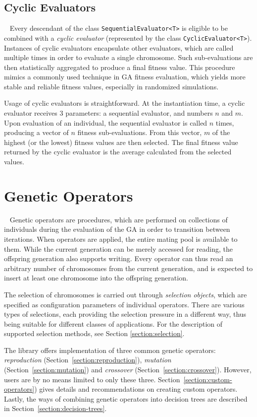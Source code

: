 \subsection{Cyclic Evaluators}~\label{section:cyclic-evaluators}
Every descendant of the class \texttt{SequentialEvaluator<T>} is eligible to be combined with a \textit{cyclic evaluator} (represented by the class \texttt{CyclicEvaluator<T>}). Instances of cyclic evaluators encapsulate other evaluators, which are called multiple times in order to evaluate a single chromosome. Such sub-evaluations are then statistically aggregated to produce a final fitness value. This procedure mimics a commonly used technique in GA fitness evaluation, which yields more stable and reliable fitness values, especially in randomized simulations.

Usage of cyclic evaluators is straightforward. At the instantiation time, a cyclic evaluator receives 3 parameters: a sequential evaluator, and numbers $n$ and $m$. Upon evaluation of an individual, the sequential evaluator is called $n$ times, producing a vector of $n$ fitness sub-evaluations. From this vector, $m$ of the highest (or the lowest) fitness values are then selected. The final fitness value returned by the cyclic evaluator is the average calculated from the selected values.

\section{Genetic Operators}~\label{section:genetic-operators}
Genetic operators are procedures, which are performed on collections of individuals during the evaluation of the GA in order to transition between iterations. When operators are applied, the entire mating pool is available to them. While the current generation can be merely accessed for reading, the offspring generation also supports writing. Every operator can thus read an arbitrary number of chromosomes from the current generation, and is expected to insert at least one chromosome into the offspring generation.

The selection of chromosomes is carried out through \textit{selection objects}, which are specified as configuration parameters of individual operators. There are various types of selections, each providing the selection pressure in a different way, thus being suitable for different classes of applications. For the description of supported selection methods, see Section \ref{section:selection}.

The library offers implementation of three common genetic operators: \textit{reproduction} (Section~\ref{section:reproduction}), \textit{mutation} (Section~\ref{section:mutation}) and \textit{crossover} (Section~\ref{section:crossover}). However, users are by no means limited to only these three. Section~\ref{section:custom-operators}) gives details and recommendations on creating custom operators. Lastly, the ways of combining genetic operators into decision trees are described in Section~\ref{section:decision-trees}.

